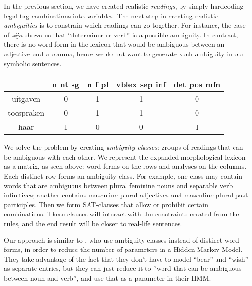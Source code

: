 In the previous section, we have created realistic \emph{readings}, by simply hardcoding legal tag combinations into variables. The next step in creating realistic \emph{ambiguities} is to constrain which readings can go together. For instance, the case of \emph{zijn} shows us that ``determiner or verb'' is a possible ambiguity. In contrast, there is no word form in the lexicon that would be ambiguous between an adjective and a comma, hence we do not want to generate such ambiguity in our symbolic sentences.

\begin{center}
\begin{tabular}{c|c|c|c|c}


            & n nt sg  & n f pl  & vblex sep inf & det pos mfn  \\ \hline
uitgaven    & 0        & 1       & 1             & 0    \\ 
toespraken  & 0        & 1       & 1             & 0    \\ 
haar        & 1        & 0       & 0             & 1    \\ 


\end{tabular}
\end{center}

We solve the problem by creating \emph{ambiguity classes}: groups of readings that can be ambiguous with each other. 
We represent the expanded morphological lexicon as a matrix, as seen
above: word forms on the rows and analyses on the columns. Each
distinct row forms an ambiguity class. For example, one class may
contain words that are ambiguous between plural feminine nouns and
separable verb infinitives; another contains masculine plural adjectives 
and masculine plural past participles.
Then we form SAT-clauses that allow or prohibit certain combinations. These clauses will interact with the constraints created from the rules, and the end result will be closer to real-life sentences.

Our approach is similar to , who use ambiguity classes instead of distinct word forms, in order to reduce the number of parameters in a Hidden Markov Model. They take advantage of the fact that they don't have to model ``bear'' and ``wish'' as separate entries, but they can just reduce it to ``word that can be ambiguous between noun and verb'', and use that as a parameter in their HMM. 

